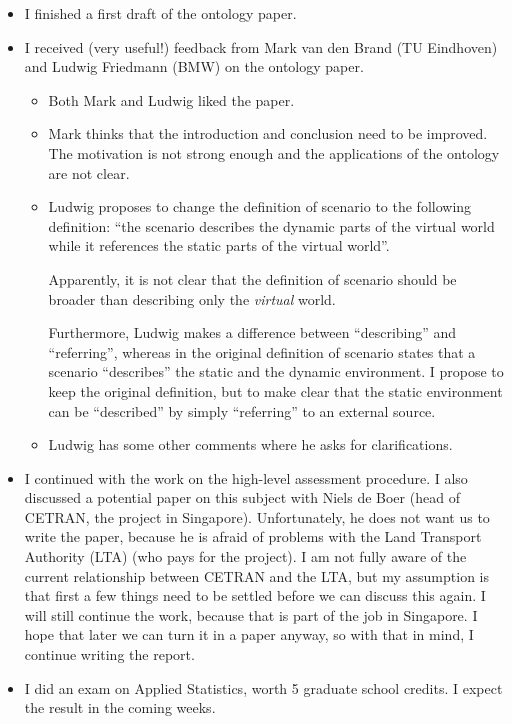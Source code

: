 \documentclass[10pt,final,a4paper,oneside,onecolumn]{article}
\begin{document}
\begin{itemize}
	\item I finished a first draft of the ontology paper.
	\item I received (very useful!) feedback from Mark van den Brand (TU Eindhoven) and Ludwig Friedmann (BMW) on the ontology paper. 
	\begin{itemize}
		\item Both Mark and Ludwig liked the paper.
		\item Mark thinks that the introduction and conclusion need to be improved. The motivation is not strong enough and the applications of the ontology are not clear.
		\item Ludwig proposes to change the definition of scenario to the following definition: ``the scenario describes the dynamic parts of the virtual world while it references the static parts of the virtual world''. 
		
		Apparently, it is not clear that the definition of scenario should be broader than describing only the \emph{virtual} world. 
		
		Furthermore, Ludwig makes a difference between ``describing'' and ``referring'', whereas in the original definition of scenario states that a scenario ``describes'' the static and the dynamic environment. I propose to keep the original definition, but to make clear that the static environment can be ``described'' by simply ``referring'' to an external source. 
		\item Ludwig has some other comments where he asks for clarifications.
	\end{itemize}
	\item I continued with the work on the high-level assessment procedure. I also discussed a potential paper on this subject with Niels de Boer (head of CETRAN, the project in Singapore). Unfortunately, he does not want us to write the paper, because he is afraid of problems with the Land Transport Authority (LTA) (who pays for the project). I am not fully aware of the current relationship between CETRAN and the LTA, but my assumption is that first a few things need to be settled before we can discuss this again. I will still continue the work, because that is part of the job in Singapore. I hope that later we can turn it in a paper anyway, so with that in mind, I continue writing the report.
	\item I did an exam on Applied Statistics, worth 5 graduate school credits. I expect the result in the coming weeks.
\end{itemize}
\end{document}
